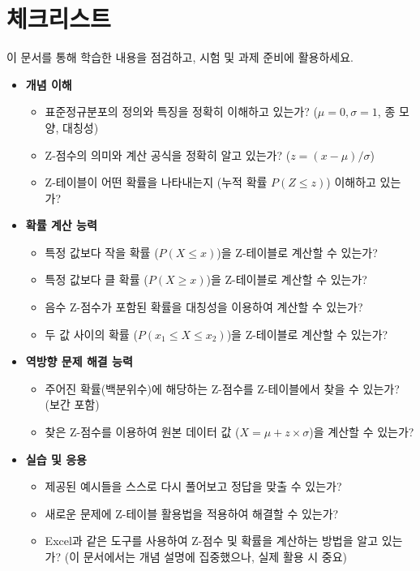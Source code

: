 \documentclass[11pt,a4paper]{article}
\begin{document}
\newpage
\section*{체크리스트}
이 문서를 통해 학습한 내용을 점검하고, 시험 및 과제 준비에 활용하세요.

\begin{itemize}
    \item \textbf{개념 이해}
    \begin{itemize}
        \item 표준정규분포의 정의와 특징을 정확히 이해하고 있는가? ($\mu=0, \sigma=1$, 종 모양, 대칭성)
        \item Z-점수의 의미와 계산 공식을 정확히 알고 있는가? ($z = (x - \mu) / \sigma$)
        \item Z-테이블이 어떤 확률을 나타내는지 (누적 확률 $P(Z \le z)$) 이해하고 있는가?
    \end{itemize}
    \item \textbf{확률 계산 능력}
    \begin{itemize}
        \item 특정 값보다 작을 확률 ($P(X \le x)$)을 Z-테이블로 계산할 수 있는가?
        \item 특정 값보다 클 확률 ($P(X \ge x)$)을 Z-테이블로 계산할 수 있는가?
        \item 음수 Z-점수가 포함된 확률을 대칭성을 이용하여 계산할 수 있는가?
        \item 두 값 사이의 확률 ($P(x_1 \le X \le x_2)$)을 Z-테이블로 계산할 수 있는가?
    \end{itemize}
    \item \textbf{역방향 문제 해결 능력}
    \begin{itemize}
        \item 주어진 확률(백분위수)에 해당하는 Z-점수를 Z-테이블에서 찾을 수 있는가? (보간 포함)
        \item 찾은 Z-점수를 이용하여 원본 데이터 값 ($X = \mu + z \times \sigma$)을 계산할 수 있는가?
    \end{itemize}
    \item \textbf{실습 및 응용}
    \begin{itemize}
        \item 제공된 예시들을 스스로 다시 풀어보고 정답을 맞출 수 있는가?
        \item 새로운 문제에 Z-테이블 활용법을 적용하여 해결할 수 있는가?
        \item Excel과 같은 도구를 사용하여 Z-점수 및 확률을 계산하는 방법을 알고 있는가? (이 문서에서는 개념 설명에 집중했으나, 실제 활용 시 중요)
    \end{itemize}
\end{itemize}
\end{document}
